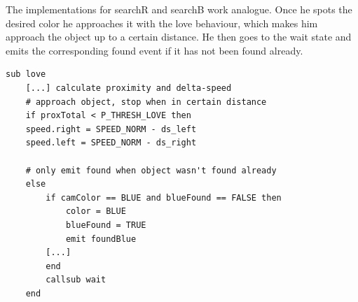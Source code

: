 \documentclass[12pt,a4paper]{article}
\begin{document}
\noindent The implementations for searchR and searchB work analogue. Once he spots the desired color he approaches it with the love behaviour, which makes him approach the object up to a certain distance. He then goes to the wait state and emits the corresponding found event if it has not been found already. 
\begin{lstlisting}
sub love
	[...] calculate proximity and delta-speed	
	# approach object, stop when in certain distance
	if proxTotal < P_THRESH_LOVE then	
	speed.right = SPEED_NORM - ds_left
	speed.left = SPEED_NORM - ds_right
	
	# only emit found when object wasn't found already
	else
		if camColor == BLUE and blueFound == FALSE then
			color = BLUE
			blueFound = TRUE
			emit foundBlue
		[...]
		end
		callsub wait
	end
\end{lstlisting}
\end{document}
